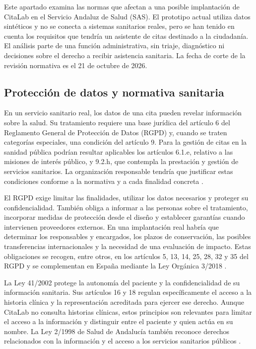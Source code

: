 Este apartado examina las normas que afectan a una posible implantación de CitaLab en el Servicio Andaluz de Salud (SAS). El prototipo actual utiliza datos sintéticos y no se conecta a sistemas sanitarios reales, pero se han tenido en cuenta los requisitos que tendría un asistente de citas destinado a la ciudadanía. El análisis parte de una función administrativa, sin triaje, diagnóstico ni decisiones sobre el derecho a recibir asistencia sanitaria. La fecha de corte de la revisión normativa es el 21 de octubre de 2026.

\subsection{Protección de datos y normativa sanitaria}

En un servicio sanitario real, los datos de una cita pueden revelar información sobre la salud. Su tratamiento requiere una base jurídica del artículo 6 del Reglamento General de Protección de Datos (RGPD) y, cuando se traten categorías especiales, una condición del artículo 9. Para la gestión de citas en la sanidad pública podrían resultar aplicables los artículos 6.1.e, relativo a las misiones de interés público, y 9.2.h, que contempla la prestación y gestión de servicios sanitarios. La organización responsable tendría que justificar estas condiciones conforme a la normativa y a cada finalidad concreta \citep{eu2016gdpr}.

El RGPD exige limitar las finalidades, utilizar los datos necesarios y proteger su confidencialidad. También obliga a informar a las personas sobre el tratamiento, incorporar medidas de protección desde el diseño y establecer garantías cuando intervienen proveedores externos. En una implantación real habría que determinar los responsables y encargados, los plazos de conservación, las posibles transferencias internacionales y la necesidad de una evaluación de impacto. Estas obligaciones se recogen, entre otros, en los artículos 5, 13, 14, 25, 28, 32 y 35 del RGPD y se complementan en España mediante la Ley Orgánica 3/2018 \citep{es2018lopd,eu2016gdpr}.

La Ley 41/2002 protege la autonomía del paciente y la confidencialidad de su información sanitaria. Sus artículos 16 y 18 regulan específicamente el acceso a la historia clínica y la representación acreditada para ejercer ese derecho. Aunque CitaLab no consulta historias clínicas, estos principios son relevantes para limitar el acceso a la información y distinguir entre el paciente y quien actúa en su nombre. La Ley 2/1998 de Salud de Andalucía también reconoce derechos relacionados con la información y el acceso a los servicios sanitarios públicos \citep{andalucia1998salud,es2002autonomia}.

